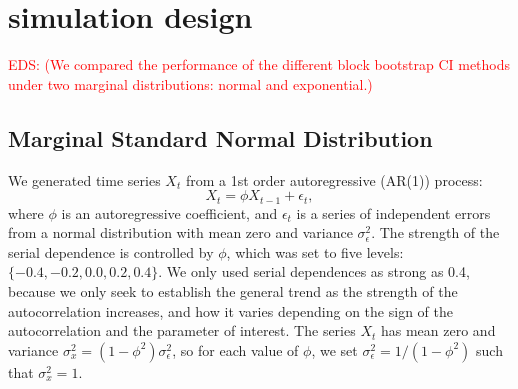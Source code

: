 \documentclass[10pt]{article}
\newcommand{\eds}[1]{\textcolor{red}{EDS: (#1)}}
\begin{document}
\section*{simulation design}
\label{sec:simdes}


\eds{We compared the performance of the different block bootstrap CI methods 
under two marginal distributions: normal and exponential.} 

\subsection*{Marginal Standard Normal Distribution}
We generated time series $X_t$ from a 1st 
order autoregressive (AR(1)) process:
\begin{equation*}
X_t = \phi X_{t-1} + \epsilon_t,
\end{equation*}
where $\phi$ is an autoregressive coefficient, and $\epsilon_t$ is a series of
independent errors from a normal distribution with mean zero and variance
$\sigma_{\epsilon}^2$. The strength of the serial dependence is controlled by
$\phi$, which was set to five levels: $\{-0.4, -0.2, 0.0, 0.2, 0.4\}$. We only
used serial dependences as strong as 0.4, because we only seek to 
establish the 
general trend as the strength of the autocorrelation 
increases, and how it varies depending on the sign of the autocorrelation and 
the parameter of interest. The 
series $X_t$ has mean zero and variance 
$\sigma_x^2 = (1 - \phi^2) \sigma_{\epsilon}^2$, so for each value of $\phi$, we 
set $\sigma_{\epsilon}^2 = 1 / (1 - \phi^2)$ such that $\sigma_x^2 = 1$.
\end{document}
